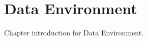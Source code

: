 \pagebreak
\chapter{Data Environment}
\label{chap:data_environment}

Chapter introduction for Data Environment.
